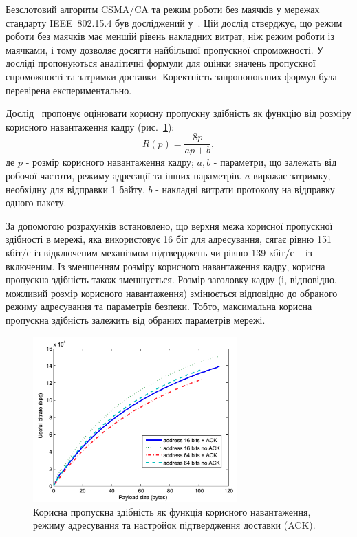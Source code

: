 \documentclass[a4paper,ukrainian,utf8,nocolumnsxix,floatsection,equationsection]{eskdtext}
\newcommand{\figref}[1]{рис.~\ref{#1}}
\newcommand{\iee}[0]{IEEE~802.15.4\xspace}
\newcommand{\csma}[0]{CSMA/CA\xspace}
\begin{document}
Безслотовий алгоритм \csma та режим роботи без маячків у мережах стандарту \iee був досліджений у~\cite{thoroughput:analysis:unslotted:ieee}. Цій дослід стверджує, що режим роботи без маячків має меншій рівень накладних витрат, ніж режим роботи із маячками, і тому дозволяє досягти найбільшої пропускної спроможності. У досліді пропонуються аналітичні формули для оцінки значень пропускної спроможності та затримки доставки. Коректність запропонованих формул була перевірена експериментально.

Дослід~\cite{thoroughput:analysis:unslotted:ieee} пропонує оцінювати корисну пропускну здібність як функцію від розміру корисного навантаження кадру (\figref{fig:throughput_graph}):
\begin{equation}\label{eq:throughput}
	R(p) = \frac{8p}{ap + b},
\end{equation}
де $p$ - розмір корисного навантаження кадру;
$a,b$ - параметри, що залежать від робочої частоти, режиму адресації та інших параметрів. $a$ виражає затримку, необхідну для відправки 1 байту, $b$ - накладні витрати протоколу на відправку одного пакету.


За допомогою розрахунків встановлено, що верхня межа корисної пропускної здібності в мережі, яка використовує 16 біт для адресування, сягає рівню 151 кбіт/с із відключеним механізмом підтверджень чи рівню 139 кбіт/с – із включеним. Із зменшенням розміру корисного навантаження кадру, корисна пропускна здібність також зменшується. Розмір заголовку кадру (і, відповідно, можливий розмір корисного навантаження) змінюється відповідно до обраного режиму адресування та параметрів безпеки. Тобто, максимальна корисна пропускна здібність залежить від обраних параметрів мережі.

\begin{figure}[bth]
	\centering
	\includegraphics[width=0.7\textwidth]{img/throughput_graph.png}
	\caption{\label{fig:throughput_graph}Корисна пропускна здібність як функція корисного навантаження, режиму адресування та настройок підтвердження доставки (ACK).}
\end{figure}
\end{document}
